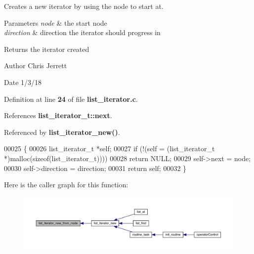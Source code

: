 Creates a new iterator by using the node to start at. 


\begin{DoxyParams}{Parameters}
{\em node} & the start node \\
\hline
{\em direction} & direction the iterator should progress in \\
\hline
\end{DoxyParams}
\begin{DoxyReturn}{Returns}
the iterator created 
\end{DoxyReturn}
\begin{DoxyAuthor}{Author}
Chris Jerrett 
\end{DoxyAuthor}
\begin{DoxyDate}{Date}
1/3/18 
\end{DoxyDate}


Definition at line \textbf{ 24} of file \textbf{ list\+\_\+iterator.\+c}.



References \textbf{ list\+\_\+iterator\+\_\+t\+::next}.



Referenced by \textbf{ list\+\_\+iterator\+\_\+new()}.


\begin{DoxyCode}
00025                                                                          \{
00026   list_iterator_t *\textcolor{keyword}{self};
00027   \textcolor{keywordflow}{if} (!(\textcolor{keyword}{self} = (list_iterator_t *)malloc(\textcolor{keyword}{sizeof}(list_iterator_t))))
00028     \textcolor{keywordflow}{return} NULL;
00029   \textcolor{keyword}{self}->next = node;
00030   \textcolor{keyword}{self}->direction = direction;
00031   \textcolor{keywordflow}{return} \textcolor{keyword}{self};
00032 \}
\end{DoxyCode}
Here is the caller graph for this function\+:\nopagebreak
\begin{figure}[H]
\begin{center}
\leavevmode
\includegraphics[width=350pt]{list__iterator_8c_af4136a8a27bdc8c0f967a708dd03d575_icgraph}
\end{center}
\end{figure}
\mbox{\label{list__iterator_8c_a2e5db981e32d3aef49ea79505a0615a6}} 
